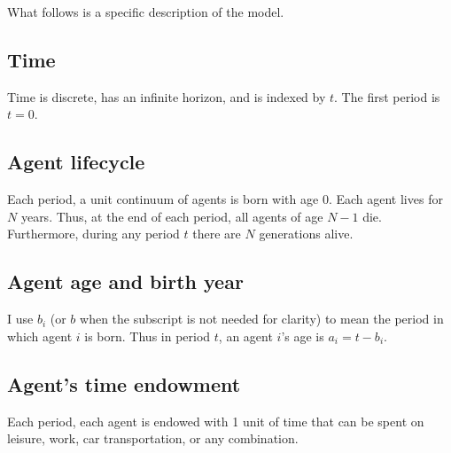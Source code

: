 \documentclass[letter, 12pt, epsf,leqno]{article}
\begin{document}
What follows is a specific description of the model.

\subsection{Time}

Time is discrete, has an infinite horizon, and is indexed by $t$.  The first period is $t=0$.

\subsection{Agent lifecycle}

Each period, a unit continuum of agents is born with age 0.  Each agent lives for $N$ years.  Thus, at the end of each period, all agents of age $N-1$ die.  Furthermore, during any period $t$ there are $N$ generations alive.

\subsection{Agent age and birth year}

I use $b_i$ (or $b$ when the subscript is not needed for clarity) to mean the period in which agent $i$ is born.  Thus in period $t$, an agent $i$'s age is $a_i = t - b_i$.

\subsection{Agent's time endowment}

Each period, each agent is endowed with 1 unit of time that can be spent on leisure, work, car transportation, or any combination.





\end{document}
